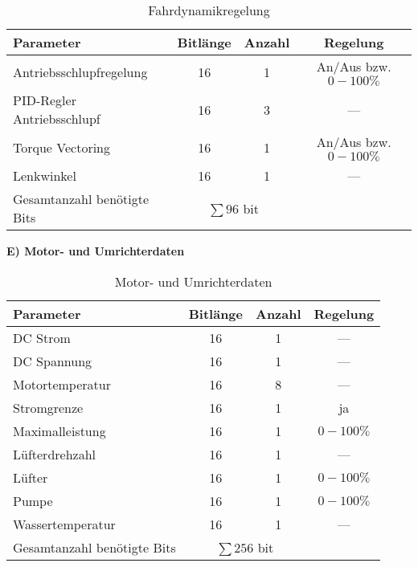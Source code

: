 \documentclass[fontsize = 12pt, paper = a4]{scrreprt}
\begin{document}
\begin{table}[h]
\caption{Fahrdynamikregelung}

\begin{tabular}{ l | c | c | c }

\toprule[1.5pt]
\textbf{Parameter} & \textbf{Bitlänge} & \textbf{Anzahl} & \textbf{Regelung} \\ 

\midrule
Antriebsschlupfregelung    & 16 & 1 & An/Aus bzw. $0-100\%$ \\
\gls{PID-Regler} Antriebsschlupf & 16 & 3 & --- \\
\gls{Torque Vectoring}           & 16 & 1 & An/Aus bzw. $0-100\%$ \\
Lenkwinkel                 & 16 & 1 & ---\\

\midrule
Gesamtanzahl benötigte Bits & \multicolumn{2}{c}{$\sum 96$ bit} \\

\bottomrule[1.5pt]

\end{tabular}

\label{Fahrdynamikregelung}
\end{table}

\newpage

\vspace{\baselineskip}


\textbf{E) Motor- und \gls{Umrichter}daten} 

\begin{table}[h]
\caption{Motor- und Umrichterdaten}

\begin{tabular}{ l | c | c | c }

\toprule[1.5pt]
\textbf{Parameter} & \textbf{Bitlänge} & \textbf{Anzahl} & \textbf{Regelung} \\ 

\midrule
\gls{DC} Strom              & 16 & 1 & --- \\
\gls{DC} Spannung           & 16 & 1 & --- \\
Motortemperatur             & 16 & 8 & --- \\
Stromgrenze                 & 16 & 1 & ja \\
Maximalleistung             & 16 & 1 & $0-100\%$ \\
Lüfterdrehzahl              & 16 & 1 & --- \\
Lüfter                      & 16 & 1 & $0-100\%$ \\
Pumpe                       & 16 & 1 & $0-100\%$ \\
Wassertemperatur            & 16 & 1 & --- \\

\midrule
Gesamtanzahl benötigte Bits & \multicolumn{2}{c}{$\sum 256$ bit} \\

\bottomrule[1.5pt]

\end{tabular}

\label{Motor- und Umrichterdaten}
\end{table}
\end{document}
